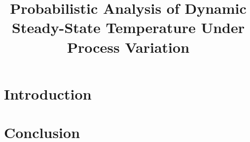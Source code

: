\documentclass[conference]{IEEEtran}
\begin{document}
  \title{Probabilistic Analysis of Dynamic Steady-State Temperature Under Process Variation}

  \author{}

  \maketitle

  \begin{abstract}
    
  \end{abstract}

  \section{Introduction} 
  

  \section{Conclusion} 
  

  \printbibliography
\end{document}
